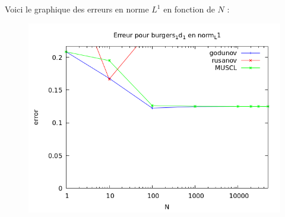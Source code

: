 \documentclass{article}
\begin{document}
Voici le graphique des erreurs en norme $L^1$ en fonction de $N$ :

\begin{figure}[H]
	\centering
	\includegraphics[scale=0.5]{figure/error_burgers.png}
\end{figure} 
\end{document}
